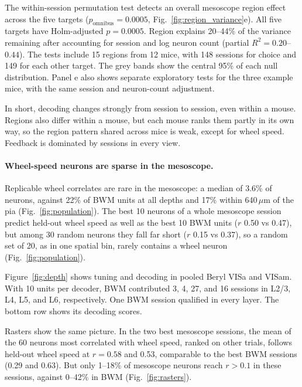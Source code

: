 \documentclass[10pt]{article}
\newcommand{\um}{\,$\mu$m}
\newcommand{\figref}[1]{Fig.~\ref{fig:#1}}
\begin{document}
The within-session permutation test detects an overall mesoscope region effect across the five targets ($p_\mathrm{omnibus}=0.0005$, \figref{region_variance}e). All five targets have Holm-adjusted $p=0.0005$. Region explains 20--44\% of the variance remaining after accounting for session and log neuron count (partial $R^2=0.20$--$0.44$). The tests include 15 regions from 12 mice, with 148 sessions for choice and 149 for each other target. The grey bands show the central 95\% of each null distribution. Panel e also shows separate exploratory tests for the three example mice, with the same session and neuron-count adjustment.

In short, decoding changes strongly from session to session, even within a mouse. Regions also differ within a mouse, but each mouse ranks them partly in its own way, so the region pattern shared across mice is weak, except for wheel speed. Feedback is dominated by sessions in every view.

\FloatBarrier



\FloatBarrier
\paragraph{Wheel-speed neurons are sparse in the mesoscope.}
Replicable wheel correlates are rare in the mesoscope: a median of 3.6\% of neurons, against 22\% of BWM units at all depths and 17\% within 640\um{} of the pia (\figref{population}). The best 10 neurons of a whole mesoscope session predict held-out wheel speed as well as the best 10 BWM units ($r$ 0.50 vs 0.47), but among 30 random neurons they fall far short ($r$ 0.15 vs 0.37), so a random set of 20, as in one spatial bin, rarely contains a wheel neuron (\figref{population}).

Figure~\ref{fig:depth} shows tuning and decoding in pooled Beryl VISa and VISam. With 10 units per decoder, BWM contributed 3, 4, 27, and 16 sessions in L2/3, L4, L5, and L6, respectively. One BWM session qualified in every layer. The bottom row shows its decoding scores.



Rasters show the same picture. In the two best mesoscope sessions, the mean of the 60 neurons most correlated with wheel speed, ranked on other trials, follows held-out wheel speed at $r = 0.58$ and 0.53, comparable to the best BWM sessions (0.29 and 0.63). But only 1--18\% of mesoscope neurons reach $r > 0.1$ in these sessions, against 0--42\% in BWM (\figref{rasters}).
\end{document}
